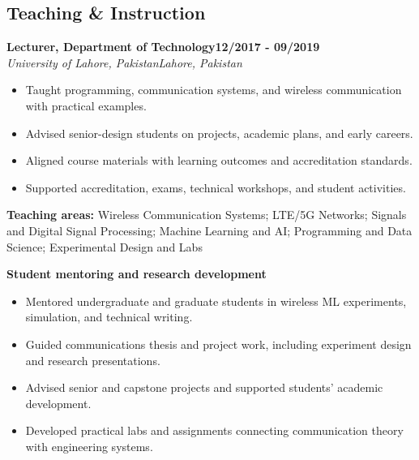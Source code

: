 \documentclass[10pt,letterpaper]{extarticle}
\newcommand{\role}[4]{%
  \Needspace{4\baselineskip}\textbf{#1}\hfill\textbf{#2}\\[-1pt]
  \textit{#3}\hfill\textit{#4}\par}
\begin{document}
\subsection{Teaching \& Instruction}
\role{Lecturer, Department of Technology}{12/2017 - 09/2019}{University of Lahore, Pakistan}{Lahore, Pakistan}
\begin{itemize}
\item Taught programming, communication systems, and wireless communication with practical examples.
\item Advised senior-design students on projects, academic plans, and early careers.
\item Aligned course materials with learning outcomes and accreditation standards.
\item Supported accreditation, exams, technical workshops, and student activities.
\end{itemize}
\vspace{1pt}
{\small\textbf{Teaching areas:} Wireless Communication Systems; LTE/5G Networks; Signals and Digital Signal Processing; Machine Learning and AI; Programming and Data Science; Experimental Design and Labs}\par
{}\noindent\textbf{Student mentoring and research development}\par
\begin{itemize}
\item Mentored undergraduate and graduate students in wireless ML experiments, simulation, and technical writing.
\item Guided communications thesis and project work, including experiment design and research presentations.
\item Advised senior and capstone projects and supported students' academic development.
\item Developed practical labs and assignments connecting communication theory with engineering systems.
\end{itemize}
\end{document}

